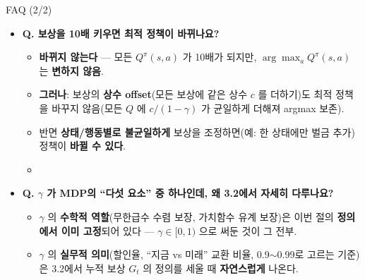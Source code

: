 \begin{frame}{FAQ (2/2)}
  \begin{itemize}
    \item \textbf{Q. 보상을 10배 키우면 최적 정책이 바뀌나요?}
      \begin{itemize}
        \item \textbf{바뀌지 않는다} --- 모든 $Q^\pi(s,a)$ 가 10배가
          되지만, $\arg\max_a Q^\pi(s,a)$ 는 \textbf{변하지
          않음}.
        \item \textbf{그러나}: 보상의 \textbf{상수 offset}(모든
          보상에 같은 상수 $c$ 를 더하기)도 최적 정책을 바꾸지
          않음(모든 $Q$ 에 $c/(1-\gamma)$ 가 균일하게 더해져
          argmax 보존).
        \item 반면 \textbf{상태/행동별로 불균일하게} 보상을
          조정하면(예: 한 상태에만 벌금 추가) 정책이 \textbf{바뀔
          수 있다}.
        \item {}
      \end{itemize}
    \item \textbf{Q. $\gamma$ 가 MDP의 ``다섯 요소'' 중 하나인데,
      왜 3.2에서 자세히 다루나요?}
      \begin{itemize}
        \item $\gamma$ 의 \textbf{수학적 역할}(무한급수 수렴 보장,
          가치함수 유계 보장)은 이번 절의 \textbf{정의에서 이미
          고정}되어 있다 --- $\gamma \in [0,1)$ 으로 써둔 것이
          그 전부.
        \item $\gamma$ 의 \textbf{실무적 의미}(할인율,
          ``지금 vs 미래'' 교환 비율, 0.9$\sim$0.99로 고르는
          기준)은 3.2에서 누적 보상 $G_t$ 의 정의를 세울 때
          \textbf{자연스럽게} 나온다.
      \end{itemize}
  \end{itemize}
\end{frame}
